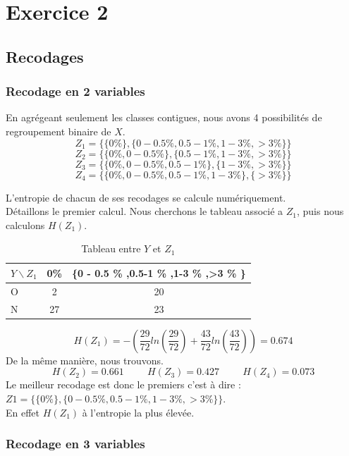 \documentclass{article}
\begin{document}
\newpage
\section{Exercice 2}
\label{exercice2}
\subsection{Recodages}

\subsubsection{Recodage en 2 variables}

En agrégeant seulement les classes contigues, nous avons 4 possibilités de regroupement binaire de 
$X$.
\\
 

\[
Z_1 =\{ \{0 \% \} , \{0 - 0.5 \% ,0.5-1 \% ,1-3 \% ,>3 \% \} \}  
\]
\[
Z_2 =\{ \{0 \% , 0 - 0.5 \%  \} , \{0.5-1 \% ,1-3 \% ,>3 \% \} \}
\]
\[
Z_3 =\{ \{0 \%, 0 - 0.5 \% ,0.5-1 \%  \} , \{1-3 \% ,>3 \% \} \}
\]
\[
Z_4 =\{ \{0 \% , 0 - 0.5 \% ,0.5-1 \% ,1-3 \% \} , \{>3 \% \} \}
\]


L'entropie de chacun de ses recodages se calcule numériquement.
\\
Détaillons le premier calcul. Nous cherchons le tableau associé a $Z_1$, puis nous calculons $H(Z_1)$.
\begin{table}[H]
  \centering
    \caption{Tableau entre $Y$ et $Z_1$}
    \begin{tabular}{|l|c|c|}
    \hline
    $Y \backslash Z_1$ & 0\% & \{0 - 0.5 \% ,0.5-1 \% ,1-3 \% ,>3 \% \} \\ \hline
    O                    & 2  & 20  \\ \hline
    N                    & 27  & 23  \\ \hline
    \end{tabular}
\end{table}
\[
H(Z_1) = -\left(\frac{29}{72}ln(\frac{29}{72})+\frac{43}{72}ln(\frac{43}{72})\right) = 0.674
\]
De la même manière, nous trouvons.
\[
H(Z_2) = 0.661 \hspace{1cm} H(Z_3) = 0.427 \hspace{1cm} H(Z_4) = 0.073
\]
Le meilleur recodage est donc le premiers c'est à dire :
$Z1 =\{ \{0 \% \} , \{0 - 0.5 \% ,0.5-1 \% ,1-3 \% ,>3 \% \} \}$.\\
En effet $H(Z_1)$ à l'entropie la plus élevée.


\subsubsection{Recodage en 3 variables}
\end{document}
